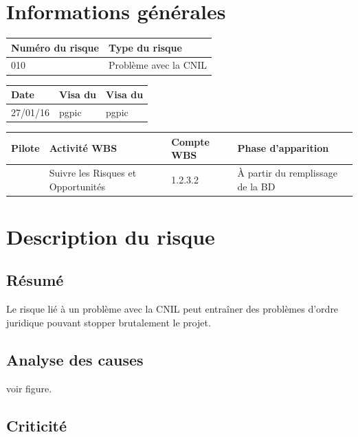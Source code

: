 \documentclass[11pt]{article}
\begin{document}
\section*{Informations générales}
 
\begin{table}[h]
\centering
	\begin{tabularx}{16.8cm}{|X|X|}
	\hline
	Numéro du risque & Type du risque \\
	\hline
	010 & Problème avec la CNIL\\
	\hline
	\end{tabularx}
\end{table}

\begin{table}[h]
\centering
	\begin{tabularx}{12.8cm}{|X|X|X|}
	\hline
	Date & Visa du \RQ & Visa du \CP \\
	\hline
	 27/01/16 & pgpic & pgpic \\
	\hline
	\end{tabularx}
\end{table}

\begin{table}[h]
\centering
	\begin{tabularx}{12.8cm}{|X|X|X|X|}
	\hline
	Pilote & Activité WBS & Compte WBS & Phase d'apparition \\
	\hline
	 \Pierre & Suivre les Risques et Opportunités & 1.2.3.2 & À partir du remplissage de la BD \\
	\hline
	\end{tabularx}
\end{table}

\section*{Description du risque}

\subsection*{Résumé}
	Le risque lié à un problème avec la CNIL peut entraîner des problèmes d'ordre juridique pouvant stopper brutalement le projet.
	
\subsection*{Analyse des causes}
	voir figure.

\subsection*{Criticité}
\end{document}
